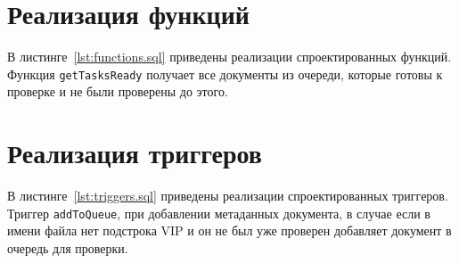 \section{Реализация функций}
В листинге~\ref{lst:functions.sql} приведены реализации спроектированных функций. Функция \texttt{getTasksReady} получает все документы из очереди, которые готовы к проверке и не были проверены до этого.

\section{Реализация триггеров}
В листинге~\ref{lst:triggers.sql} приведены реализации спроектированных триггеров. Триггер \texttt{addToQueue}, при добавлении метаданных документа, в случае если в имени файла нет подстрока VIP и он не был уже проверен добавляет документ в очередь для проверки.















